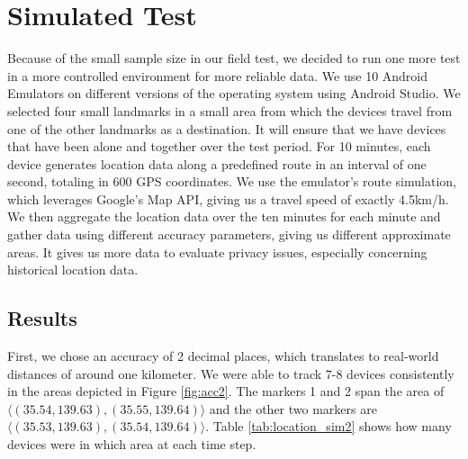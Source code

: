 \section{Simulated Test}
Because of the small sample size in our field test, we decided to run one more test in a more controlled environment for more reliable data. We use 10 Android Emulators on different versions of the operating system using Android Studio. We selected four small landmarks in a small area from which the devices travel from one of the other landmarks as a destination. It will ensure that we have devices that have been alone and together over the test period. For 10 minutes, each device generates location data along a predefined route in an interval of one second, totaling in 600 GPS coordinates. We use the emulator's route simulation, which leverages Google's Map API, giving us a travel speed of exactly 4.5km/h. We then aggregate the location data over the ten minutes for each minute and gather data using different accuracy parameters, giving us different approximate areas. It gives us more data to evaluate privacy issues, especially concerning historical location data.

\subsection{Results}
First, we chose an accuracy of 2 decimal places, which translates to real-world distances of around one kilometer. We were able to track 7-8 devices consistently in the areas depicted in Figure \ref{fig:acc2}. The markers 1 and 2 span the area of \(\langle(35.54, 139.63),(35.55, 139.64)\rangle\) and the other two markers are \(\langle(35.53, 139.63),(35.54, 139.64)\rangle\). Table \ref{tab:location_sim2} shows how many devices were in which area at each time step. 

